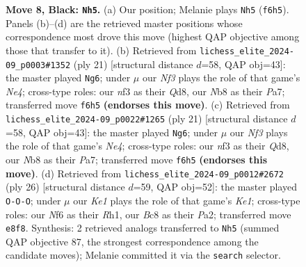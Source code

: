 \documentclass[11pt]{article}
\begin{document}
\begin{figure}[p]
\caption{\textbf{Move 8, Black: \texttt{Nh5}.} (a) Our position; Melanie plays \texttt{Nh5} (\texttt{f6h5}). Panels (b)--(d) are the retrieved master positions whose correspondence most drove this move (highest QAP objective among those that transfer to it). (b) Retrieved from \texttt{lichess\_elite\_2024-09\_p0003\#1352} (ply 21) [structural distance $d$=58, QAP obj=43]: the master played \texttt{Ng6}; under $\mu$ our \emph{Nf3} plays the role of that game's \emph{Ne4}; cross-type roles: our \emph{n}f3 as their \emph{Q}d8, our \emph{N}b8 as their \emph{P}a7; transferred move \texttt{f6h5} \textbf{(endorses this move)}. (c) Retrieved from \texttt{lichess\_elite\_2024-09\_p0022\#1265} (ply 21) [structural distance $d$=58, QAP obj=43]: the master played \texttt{Ng6}; under $\mu$ our \emph{Nf3} plays the role of that game's \emph{Ne4}; cross-type roles: our \emph{n}f3 as their \emph{Q}d8, our \emph{N}b8 as their \emph{P}a7; transferred move \texttt{f6h5} \textbf{(endorses this move)}. (d) Retrieved from \texttt{lichess\_elite\_2024-09\_p0012\#2672} (ply 26) [structural distance $d$=59, QAP obj=52]: the master played \texttt{O-O-O}; under $\mu$ our \emph{Ke1} plays the role of that game's \emph{Ke1}; cross-type roles: our \emph{N}f6 as their \emph{R}h1, our \emph{B}c8 as their \emph{P}a2; transferred move \texttt{e8f8}. Synthesis: 2 retrieved analogs transferred to \texttt{Nh5} (summed QAP objective 87, the strongest correspondence among the candidate moves); Melanie committed it via the \texttt{search} selector.}
\label{fig:thought-m15}
\end{figure}

\clearpage
\end{document}
